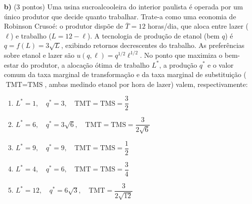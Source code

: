 \textbf{b)} (3 pontos) Uma usina sucroalcooleira do interior paulista é operada por um único produtor que decide quanto trabalhar. Trate-a como uma economia de Robinson Crusoé: o produtor dispõe de $\bar T=12$ horas/dia, que aloca entre lazer ($\ell$) e trabalho ($L=12-\ell$). A tecnologia de produção de etanol (bem $q$) é $q=f(L)=3\sqrt{L}$, exibindo retornos decrescentes do trabalho. As preferências sobre etanol e lazer são $u(q,\ell)=q^{1/2}\ell^{1/2}$. No ponto que maximiza o bem-estar do produtor, a alocação ótima de trabalho $L^{*}$, a produção $q^{*}$ e o valor comum da taxa marginal de transformação e da taxa marginal de substituição ($\text{TMT}=\text{TMS}$, ambas medindo etanol por hora de lazer) valem, respectivamente:

\begin{enumerate}[label=\Alph*., leftmargin=3.2em, itemsep=0.15em, topsep=0.2em]
  \item $L^{*}=1,\quad q^{*}=3,\quad \text{TMT}=\text{TMS}=\dfrac{3}{2}$
  \item $L^{*}=6,\quad q^{*}=3\sqrt{6},\quad \text{TMT}=\text{TMS}=\dfrac{3}{2\sqrt{6}}$
  \item $L^{*}=9,\quad q^{*}=9,\quad \text{TMT}=\text{TMS}=\dfrac{1}{2}$
  \item $L^{*}=4,\quad q^{*}=6,\quad \text{TMT}=\text{TMS}=\dfrac{3}{4}$
  \item $L^{*}=12,\quad q^{*}=6\sqrt{3},\quad \text{TMT}=\dfrac{3}{2\sqrt{12}}$
\end{enumerate}
